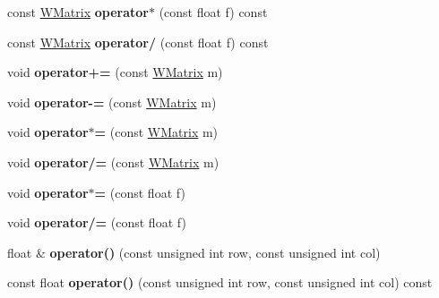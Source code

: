 \begin{DoxyCompactItemize}
\item 
const \hyperlink{class_w_matrix}{W\+Matrix} {\bfseries operator$\ast$} (const float f) const \hypertarget{class_w_matrix_a0c6d2cb720b0e7620ba863d1e184263c}{}\label{class_w_matrix_a0c6d2cb720b0e7620ba863d1e184263c}

\item 
const \hyperlink{class_w_matrix}{W\+Matrix} {\bfseries operator/} (const float f) const \hypertarget{class_w_matrix_ac0376add51280792d8664b98f3fcd462}{}\label{class_w_matrix_ac0376add51280792d8664b98f3fcd462}

\item 
void {\bfseries operator+=} (const \hyperlink{class_w_matrix}{W\+Matrix} m)\hypertarget{class_w_matrix_ad80488df1025a940932467d40898bccc}{}\label{class_w_matrix_ad80488df1025a940932467d40898bccc}

\item 
void {\bfseries operator-\/=} (const \hyperlink{class_w_matrix}{W\+Matrix} m)\hypertarget{class_w_matrix_add6710e3f502f42d270878f1f7cbff5e}{}\label{class_w_matrix_add6710e3f502f42d270878f1f7cbff5e}

\item 
void {\bfseries operator$\ast$=} (const \hyperlink{class_w_matrix}{W\+Matrix} m)\hypertarget{class_w_matrix_a884beb6a0fd099568cff7b1f9c893295}{}\label{class_w_matrix_a884beb6a0fd099568cff7b1f9c893295}

\item 
void {\bfseries operator/=} (const \hyperlink{class_w_matrix}{W\+Matrix} m)\hypertarget{class_w_matrix_a44f8f2a7973364cca98b735371f73f65}{}\label{class_w_matrix_a44f8f2a7973364cca98b735371f73f65}

\item 
void {\bfseries operator$\ast$=} (const float f)\hypertarget{class_w_matrix_a30a1c2c062e2069dc864bd896773cee0}{}\label{class_w_matrix_a30a1c2c062e2069dc864bd896773cee0}

\item 
void {\bfseries operator/=} (const float f)\hypertarget{class_w_matrix_af19ffc53b742e21bd831f1831a74ec06}{}\label{class_w_matrix_af19ffc53b742e21bd831f1831a74ec06}

\item 
float \& {\bfseries operator()} (const unsigned int row, const unsigned int col)\hypertarget{class_w_matrix_a926c3ded2ce466784fcc1cb7482b8d2e}{}\label{class_w_matrix_a926c3ded2ce466784fcc1cb7482b8d2e}

\item 
const float {\bfseries operator()} (const unsigned int row, const unsigned int col) const \hypertarget{class_w_matrix_acb2e3b174261fdbe0fdf5f5cdd255e42}{}\label{class_w_matrix_acb2e3b174261fdbe0fdf5f5cdd255e42}


\end{DoxyCompactItemize}
